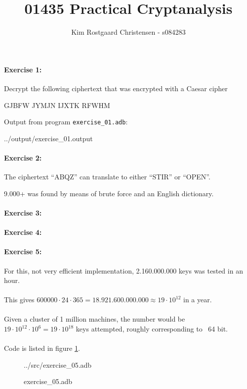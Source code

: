 \documentclass[10pt,a4paper]{article}
\title{01435 Practical Cryptanalysis}
\author{Kim Rostgaard Christensen - s084283}
\def\Code#1{\texttt{#1}}
\begin{document}
\maketitle

\paragraph{Exercise 1:} Decrypt the following ciphertext that was encrypted with a Caesar cipher
\begin{center}
GJBFW JYMJN IJXTK RFWHM
\end{center}
Output from program \Code{exercise\_01.adb}:

 {../output/exercise_01.output}

\paragraph{Exercise 2:}
The ciphertext ``ABQZ'' can translate to either ``STIR'' or ``OPEN''.

9.000+ was found by means of brute force and an English dictionary.

\paragraph{Exercise 3:}
\paragraph{Exercise 4:}
\paragraph{Exercise 5:}

For this, not very efficient implementation, 2.160.000.000 keys was tested in an hour.\\\\
This gives $600000 \cdot 24 \cdot 365 = 18.921.600.000.000 \approx 19 \cdot 10^{12}$ in a year.\\\\
Given a cluster of 1 million machines, the number would be $19 \cdot 10^{12} \cdot 10^6 = 19 \cdot 10^{18}$ keys attempted, roughly corresponding to ~64 bit.\\\\
Code is listed in figure \ref{lst:exercise_05}.

\begin{figure}
 {../src/exercise_05.adb}
\caption{exercise\_05.adb}
\label{lst:exercise_05}
\end{figure}
\end{document}
